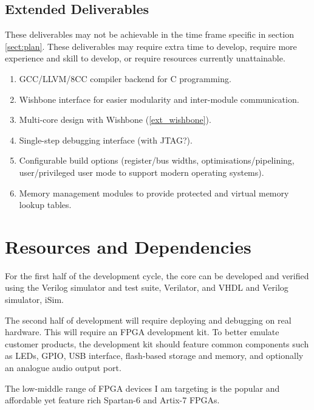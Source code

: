 \documentclass[11pt,a4paper]{article}
\begin{document}
\subsection{Extended Deliverables}
These deliverables may not be achievable in the time frame specific in section \ref{sect:plan}. These deliverables may require extra time to develop, require more experience and skill to develop, or require resources currently unattainable.

\begin{enumerate}
\item{GCC/LLVM/8CC compiler backend for C programming.}
\item{Wishbone interface for easier modularity and inter-module communication.}\label{ext_wishbone}
\item{Multi-core design with Wishbone (\ref{ext_wishbone}).}
\item{Single-step debugging interface (with JTAG?).}
\item{Configurable build options (register/bus widths, optimisations/pipelining, user/privileged user mode to support modern operating systems).}
\item{Memory management modules to provide protected and virtual memory lookup tables.}
\end{enumerate}

\section{Resources and Dependencies}
For the first half of the development cycle, the core can be developed and verified using the Verilog simulator and test suite, Verilator, and VHDL and Verilog simulator, iSim.

The second half of development will require deploying and debugging on real hardware. This will require an FPGA development kit. To better emulate customer products, the development kit should feature common components such as LEDs, GPIO, USB interface, flash-based storage and memory, and optionally an analogue audio output port.

The low-middle range of FPGA devices I am targeting is the popular and affordable yet feature rich Spartan-6 and Artix-7 FPGAs.
\end{document}
